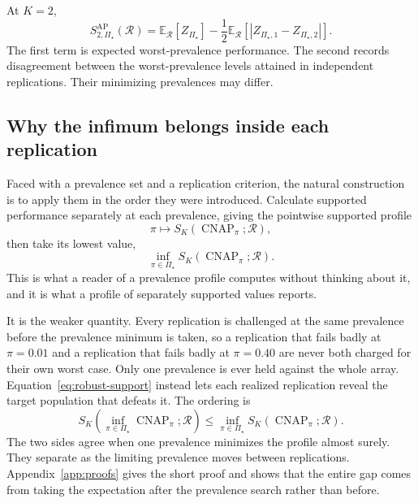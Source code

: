 \documentclass[11pt]{article}
\newcommand{\CNAP}{\operatorname{CNAP}}
\newcommand{\Regime}{\mathcal{R}}
\newcommand{\PSet}{\Pi_\star}
\newcommand{\E}{\mathbb{E}}
\theoremstyle{remark}
\begin{document}
At $K=2$,
\begin{equation}
S_{2,\PSet}^{\mathrm{AP}}(\Regime)
=
\E_{\Regime}[Z_{\PSet}]
-
\frac12
\E_{\Regime}
\left[
|Z_{\PSet,1}-Z_{\PSet,2}|
\right].
\label{eq:robust-k2}
\end{equation}
The first term is expected worst-prevalence performance. The second records disagreement between the worst-prevalence levels attained in independent replications. Their minimizing prevalences may differ.

\subsection{Why the infimum belongs inside each replication}
\label{sec:infimum-inside}

Faced with a prevalence set and a replication criterion, the natural construction is to apply them in the order they were introduced. Calculate supported performance separately at each prevalence, giving the pointwise supported profile
\[
\pi
\longmapsto
S_K(\CNAP_\pi;\Regime),
\]
then take its lowest value,
\[
\inf_{\pi\in\PSet}S_K(\CNAP_\pi;\Regime).
\]
This is what a reader of a prevalence profile computes without thinking about it, and it is what a profile of separately supported values reports.

It is the weaker quantity. Every replication is challenged at the same prevalence before the prevalence minimum is taken, so a replication that fails badly at $\pi=0.01$ and a replication that fails badly at $\pi=0.40$ are never both charged for their own worst case. Only one prevalence is ever held against the whole array. Equation~\eqref{eq:robust-support} instead lets each realized replication reveal the target population that defeats it. The ordering is
\begin{equation}
S_K\left(
\inf_{\pi\in\PSet}\CNAP_\pi;
\Regime
\right)
\leq
\inf_{\pi\in\PSet}
S_K(\CNAP_\pi;\Regime).
\label{eq:strong-weak-order}
\end{equation}
The two sides agree when one prevalence minimizes the profile almost surely. They separate as the limiting prevalence moves between replications. Appendix~\ref{app:proofs} gives the short proof and shows that the entire gap comes from taking the expectation after the prevalence search rather than before.
\end{document}
